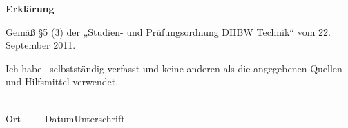 
\newpage
\thispagestyle{empty}

\begin{center}
\Large\bfseries Erkl\"arung
\end{center}

\noindent
Gem\"a\ss{} \S5 (3)  der „Studien- und Pr\"ufungsordnung DHBW Technik“ vom 22. September 2011.

\medskip
\noindent
Ich habe \WasErklaerung\ selbstst\"andig verfasst und
keine anderen als die angegebenen Quellen und Hilfsmittel verwendet.

\vspace{3cm}
\noindent
\underline{\hspace{4cm}}\hfill\underline{\hspace{6cm}}\\
Ort~~~~~Datum\hfill Unterschrift\hspace{4cm}
